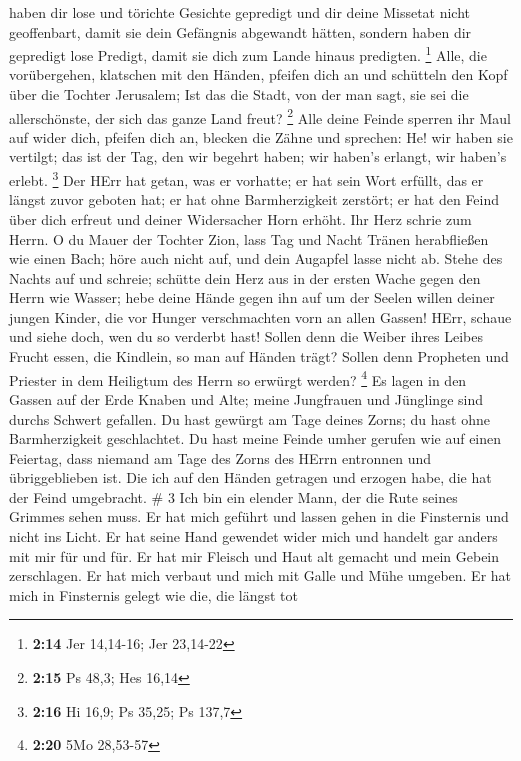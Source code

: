 haben dir lose und törichte Gesichte gepredigt und dir deine Missetat
nicht geoffenbart, damit sie dein Gefängnis abgewandt hätten, sondern
haben dir gepredigt lose Predigt, damit sie dich zum Lande hinaus
predigten. \footnote{\textbf{2:14} Jer 14,14-16; Jer 23,14-22}
 Alle, die vorübergehen, klatschen mit den Händen, pfeifen
dich an und schütteln den Kopf über die Tochter Jerusalem; Ist das die
Stadt, von der man sagt, sie sei die allerschönste, der sich das ganze
Land freut? \footnote{\textbf{2:15} Ps 48,3; Hes 16,14} 
Alle deine Feinde sperren ihr Maul auf wider dich, pfeifen dich an,
blecken die Zähne und sprechen: He! wir haben sie vertilgt; das ist der
Tag, den wir begehrt haben; wir haben's erlangt, wir haben's erlebt.
\footnote{\textbf{2:16} Hi 16,9; Ps 35,25; Ps 137,7}  Der
HErr hat getan, was er vorhatte; er hat sein Wort erfüllt, das er längst
zuvor geboten hat; er hat ohne Barmherzigkeit zerstört; er hat den Feind
über dich erfreut und deiner Widersacher Horn erhöht.  Ihr
Herz schrie zum Herrn. O du Mauer der Tochter Zion, lass Tag und Nacht
Tränen herabfließen wie einen Bach; höre auch nicht auf, und dein
Augapfel lasse nicht ab.  Stehe des Nachts auf und schreie;
schütte dein Herz aus in der ersten Wache gegen den Herrn wie Wasser;
hebe deine Hände gegen ihn auf um der Seelen willen deiner jungen
Kinder, die vor Hunger verschmachten vorn an allen Gassen! 
HErr, schaue und siehe doch, wen du so verderbt hast! Sollen denn die
Weiber ihres Leibes Frucht essen, die Kindlein, so man auf Händen trägt?
Sollen denn Propheten und Priester in dem Heiligtum des Herrn so erwürgt
werden? \footnote{\textbf{2:20} 5Mo 28,53-57}  Es lagen in
den Gassen auf der Erde Knaben und Alte; meine Jungfrauen und Jünglinge
sind durchs Schwert gefallen. Du hast gewürgt am Tage deines Zorns; du
hast ohne Barmherzigkeit geschlachtet.  Du hast meine
Feinde umher gerufen wie auf einen Feiertag, dass niemand am Tage des
Zorns des HErrn entronnen und übriggeblieben ist. Die ich auf den Händen
getragen und erzogen habe, die hat der Feind umgebracht. \# 3
 Ich bin ein elender Mann, der die Rute seines Grimmes sehen
muss.  Er hat mich geführt und lassen gehen in die
Finsternis und nicht ins Licht.  Er hat seine Hand gewendet
wider mich und handelt gar anders mit mir für und für.  Er
hat mir Fleisch und Haut alt gemacht und mein Gebein zerschlagen.
 Er hat mich verbaut und mich mit Galle und Mühe umgeben.
 Er hat mich in Finsternis gelegt wie die, die längst tot

